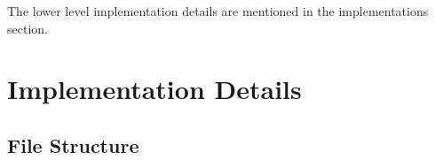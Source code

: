 \documentclass[12pt]{scrreprt}
\newcommand{\ttt}[1]{\texttt{#1}}
\begin{document}
\begin{enumerate}
\begin{enumerate}
    \end{enumerate}

\end{enumerate}

The lower level implementation details are mentioned in the implementations section. 









\chapter{Implementation Details}


\section{File Structure}




\end{document}
